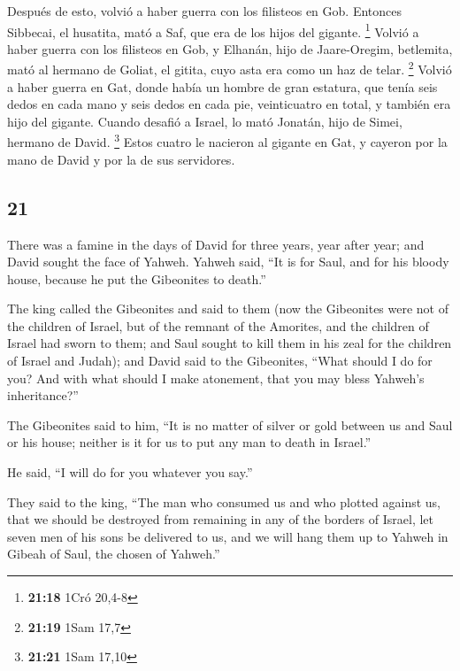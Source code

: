 \begin{paracol}{2}
 Después de esto, volvió a haber guerra con los filisteos
en Gob. Entonces Sibbecai, el husatita, mató a Saf, que era de los hijos
del gigante. \footnote{\textbf{21:18} 1Cró 20,4-8} 
Volvió a haber guerra con los filisteos en Gob, y Elhanán, hijo de
Jaare-Oregim, betlemita, mató al hermano de Goliat, el gitita, cuyo asta
era como un haz de telar. \footnote{\textbf{21:19} 1Sam 17,7}
 Volvió a haber guerra en Gat, donde había un hombre de
gran estatura, que tenía seis dedos en cada mano y seis dedos en cada
pie, veinticuatro en total, y también era hijo del gigante.
 Cuando desafió a Israel, lo mató Jonatán, hijo de Simei,
hermano de David. \footnote{\textbf{21:21} 1Sam 17,10} 
Estos cuatro le nacieron al gigante en Gat, y cayeron por la mano de
David y por la de sus servidores.

\switchcolumn
\begin{otherlanguage}{english}

\hypertarget{section-41}{%
\section{21}\label{section-41}}

 There was a famine in the days of David for three years,
year after year; and David sought the face of Yahweh. Yahweh said, ``It
is for Saul, and for his bloody house, because he put the Gibeonites to
death.''

 The king called the Gibeonites and said to them (now the
Gibeonites were not of the children of Israel, but of the remnant of the
Amorites, and the children of Israel had sworn to them; and Saul sought
to kill them in his zeal for the children of Israel and Judah);
 and David said to the Gibeonites, ``What should I do for
you? And with what should I make atonement, that you may bless Yahweh's
inheritance?''

 The Gibeonites said to him, ``It is no matter of silver
or gold between us and Saul or his house; neither is it for us to put
any man to death in Israel.''

He said, ``I will do for you whatever you say.''

 They said to the king, ``The man who consumed us and who
plotted against us, that we should be destroyed from remaining in any of
the borders of Israel,  let seven men of his sons be
delivered to us, and we will hang them up to Yahweh in Gibeah of Saul,
the chosen of Yahweh.''


\end{otherlanguage}
\end{paracol}
